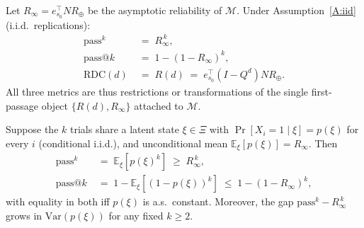 
\begin{theorem}
\label{thm:unify}
Let $R_\infty=e_{s_0}^\top N R_\oplus$ be the asymptotic reliability of
$\mathcal{M}$. Under Assumption~\ref{A:iid} (i.i.d.\ replications):
\begin{align}
\mathrm{pass}^{k} &\;=\; R_\infty^{\,k}, \label{eq:t3-passk}\\
\mathrm{pass}@k  &\;=\; 1-(1-R_\infty)^{k}, \label{eq:t3-passatk}\\
\mathrm{RDC}(d)  &\;=\; R(d) \;=\; e_{s_0}^\top(I-Q^{d})N R_\oplus. \label{eq:t3-rdc}
\end{align}
All three metrics are thus restrictions or transformations of the single
first-passage object $\{R(d),R_\infty\}$ attached to $\mathcal{M}$.
\end{theorem}

\begin{theorem}
\label{thm:corr}
Suppose the $k$ trials share a latent state $\xi\in\Xi$ with
$\Pr[X_i=1\mid\xi]=p(\xi)$ for every $i$ (conditional i.i.d.), and unconditional
mean $\mathbb{E}_\xi[p(\xi)]=R_\infty$. Then
\begin{align}
\mathrm{pass}^{k} &\;=\; \mathbb{E}_\xi[p(\xi)^{k}] \;\ge\; R_\infty^{\,k},\label{eq:t3p-passk}\\
\mathrm{pass}@k  &\;=\; 1-\mathbb{E}_\xi[(1-p(\xi))^{k}] \;\le\; 1-(1-R_\infty)^{k},\label{eq:t3p-passatk}
\end{align}
with equality in both iff $p(\xi)$ is a.s.\ constant.
Moreover, the gap
$\mathrm{pass}^{k}-R_\infty^{\,k}$ grows in $\mathrm{Var}(p(\xi))$ for any fixed $k\ge 2$.
\end{theorem}

